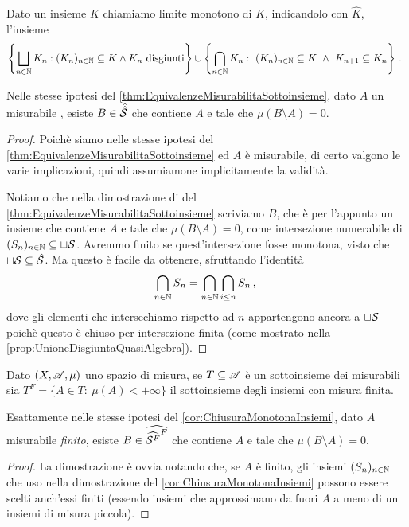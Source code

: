 \begin{corollary}\label{cor:ChiusuraMonotonaInsiemi}
	Dato un insieme $K$ chiamiamo limite monotono di $K$, indicandolo con $\hat K$, l'insieme
	\begin{equation*}
		\left\{\bigsqcup_{n\in\N}K_n:(K_n)_{n\in\N}\subseteq K\wedge K_n \text{ disgiunti}\right\}\cup
		\left\{\bigcap_{n\in\N}K_n:\ (K_n)_{n\in\N}\subseteq K\ \wedge\ K_{n+1}\subseteq K_n\right\} \punto
	\end{equation*}
	
	Nelle stesse ipotesi del \cref{thm:EquivalenzeMisurabilitaSottoinsieme}, dato $A$ un misurabile \sigfin[o], esiste $B\in\hat{\hat\S}$ che contiene $A$ e tale che $\mu(B\setminus A)=0$.
\end{corollary}
\begin{proof}
	Poichè siamo nelle stesse ipotesi del \cref{thm:EquivalenzeMisurabilitaSottoinsieme} ed $A$ è misurabile, di certo valgono le varie implicazioni, quindi assumiamone implicitamente la validità.
	
	Notiamo che nella dimostrazione di  del \cref{thm:EquivalenzeMisurabilitaSottoinsieme} scriviamo $B$, che è per l'appunto un insieme che contiene $A$ e tale che $\mu(B\setminus A)=0$, come intersezione numerabile di $(S_n)_{n\in\N}\subseteq \sqcup \S$.
	Avremmo finito se quest'intersezione fosse monotona, visto che $\sqcup \S\subseteq \hat \S$.
	Ma questo è facile da ottenere, sfruttando l'identità
	\begin{equation*}
		\bigcap_{n\in\N} S_n = \bigcap_{n\in\N} \bigcap_{i\le n} S_n \virgola
	\end{equation*}
	dove gli elementi che intersechiamo rispetto ad $n$ appartengono ancora a $\sqcup \S$ poichè questo è chiuso per intersezione finita (come mostrato nella \cref{prop:UnioneDisgiuntaQuasiAlgebra}).
\end{proof}

\begin{corollary}\label{cor:ChiusuraMonotonaInsiemiFiniti}
	Dato $(X,\A,\mu)$ uno spazio di misura, se $T\subseteq\A$ è un sottoinsieme dei misurabili sia $T^F=\{A\in T:\ \mu(A)<+\infty\}$ il sottoinsieme degli insiemi con misura finita.
	
	Esattamente nelle stesse ipotesi del \cref{cor:ChiusuraMonotonaInsiemi}, dato $A$ misurabile \emph{finito}, esiste $B\in\widehat{{\widehat{\S^F}}^F}$ che contiene $A$ e tale che $\mu(B\setminus A)=0$.
\end{corollary}
\begin{proof}
	La dimostrazione è ovvia notando che, se $A$ è finito, gli insiemi $(S_n)_{n\in\N}$ che uso nella dimostrazione del \cref{cor:ChiusuraMonotonaInsiemi} possono essere scelti anch'essi finiti (essendo insiemi che approssimano da fuori $A$ a meno di un insiemi di misura piccola).
\end{proof}



